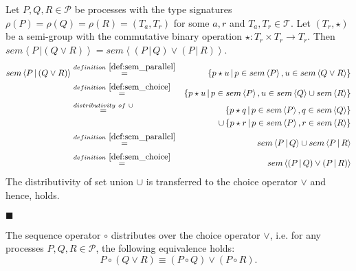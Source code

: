 \begin{myproof}
Let $P, Q, R \in \mathcal{P}$ be processes with the type signatures $\rho \left( P \right) = \rho \left( Q \right) = \rho \left( R \right) = \left( T_a, T_r \right)$ for some $a, r$ and $T_a, T_r \in \mathcal{T}$. Let $\left( T_r, \star \right)$ be a semi-group with the commutative binary operation $\star \colon T_r \times T_r \to T_r$. Then $sem \left\langle P \,| \left( Q \vee R \right) \right\rangle = sem \left\langle \left( P \,|\, Q \right) \vee \left( P \,|\, R \right) \right\rangle$.
\begin{eqnarray*}
  sem \left\langle P \,| \left( Q \vee R \right) \right\rangle & \overset{\defref{def:sem_parallel}}{=} & \left\{ p \star u \,|\, p \in sem \left\langle P \right\rangle, u \in sem \left\langle Q \vee R \right\rangle \right\} \\
  & \overset{\defref{def:sem_choice}}{=} & \left\{ p \star u \,|\, p \in sem \left\langle P \right\rangle, u \in sem \left\langle Q \right\rangle \cup sem \left\langle R \right\rangle \right\} \\
  & \overset{distributivity \ of \ \cup}{=} & \hspace*{0.8em} \left\{ p \star q \,|\, p \in sem \left\langle P \right\rangle, q \in sem \left\langle Q \right\rangle \right\} \\
  & & \cup \left\{ p \star r \,|\, p \in sem \left\langle P \right\rangle, r \in sem \left\langle R \right\rangle \right\} \\
  & \overset{\defref{def:sem_parallel}}{=} & sem \left\langle P \,|\, Q \right\rangle \cup sem \left\langle P \,|\, R \right\rangle \\
  & \overset{\defref{def:sem_choice}}{=} & sem \left\langle \left( P \,|\, Q \right) \vee \left( P \,|\, R \right) \right\rangle
\end{eqnarray*}
The distributivity of set union $\cup$ is transferred to the choice operator $\vee$ and hence,  holds.

\hfill$\blacksquare$
\end{myproof}

\begin{theorem}
\label{thm:distributivity_sequence_choice}
The sequence operator $\circ$ distributes over the choice operator $\vee$, i.e. for any processes $P, Q, R \in \mathcal{P}$, the following equivalence holds:
\begin{equation*}
  P \circ \left( Q \vee R \right) \equiv \left( P \circ Q \right) \vee \left( P \circ R \right).
\end{equation*}
\end{theorem}

